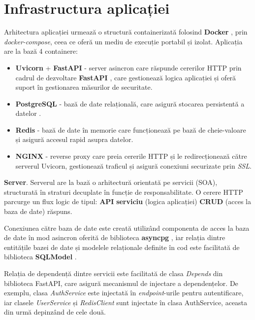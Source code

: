 \section{Infrastructura aplicației}
\label{sec:server_app}
Arhitectura aplicației urmează o structură containerizată folosind \textbf{Docker} \cite{docker}, prin \textit{docker-compose}, ceea ce oferă un mediu de execuție portabil și izolat. Aplicația are la bază 4 containere:

\begin{itemize}
    \item \textbf{Uvicorn} + \textbf{FastAPI} - server asincron \cite{uvicorn} care răspunde cererilor HTTP prin cadrul de dezvoltare \textbf{FastAPI} \cite{fastapi}, care gestionează logica aplicației și oferă suport în gestionarea măsurilor de securitate.
    \item \textbf{PostgreSQL} - bază de date relațională, care asigură stocarea persistentă a datelor \cite{postgresql}.
    \item \textbf{Redis} - bază de date în memorie care funcționează pe bază de cheie-valoare \cite{redis} și asigură accesul rapid asupra datelor.
    \item \textbf{NGINX} - reverse proxy \cite{nginx} care preia cererile HTTP și le redirecționează către serverul Uvicorn, gestionează traficul și asigură conexiuni securizate prin \textit{SSL}.
\end{itemize}

\textbf{Server}. Serverul are la bază o arhitectură orientată pe servicii (SOA), structurată în straturi decuplate în funcție de responsabilitate. O cerere HTTP parcurge un flux logic de tipul: \textbf{API} \rightarrow \space\textbf{serviciu} (logica aplicației) \rightarrow\space \textbf{CRUD} (acces la baza de date) \rightarrow\space răspuns.

Conexiunea către baza de date este creată utilizând componenta de acces la baza de date în mod asincron oferită de biblioteca \textbf{asyncpg} \cite{asyncpg}, iar relația dintre entitățile bazei de date și modelele relaționale definite în cod este facilitată de biblioteca \textbf{SQLModel} \cite{sqlmodel}.

Relația de dependență dintre servicii este facilitată de clasa \textit{Depends} din biblioteca FastAPI, care asigură mecanismul de injectare a dependențelor. De exemplu, clasa \textit{AuthService} este injectată în \textit{endpoint}-urile pentru autentificare, iar clasele \textit{UserService} și \textit{RedisClient} sunt injectate în clasa AuthService, aceasta din urmă depinzând de cele două.

